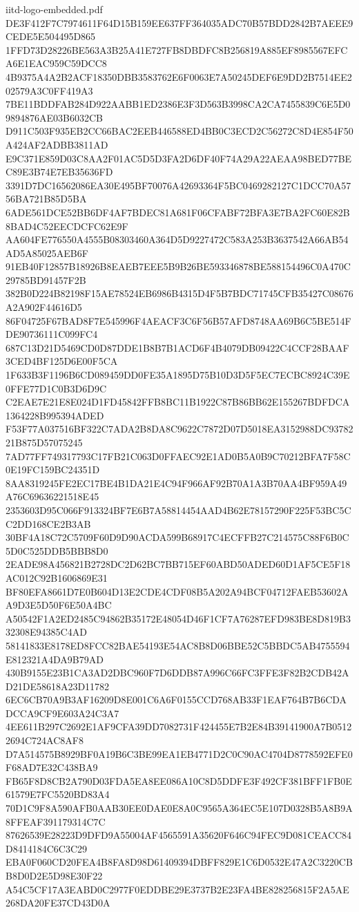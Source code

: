 \begin{filecontents*}[overwrite]{iitd-logo-embedded.pdf}
DE3F412F7C7974611F64D15B159EE637FF364035ADC70B57BDD2842B7AEEE9CEDE5E504495D865
1FFD73D28226BE563A3B25A41E727FB8DBDFC8B256819A885EF8985567EFCA6E1EAC959C59DCC8
4B9375A4A2B2ACF18350DBB3583762E6F0063E7A50245DEF6E9DD2B7514EE202579A3C0FF419A3
7BE11BDDFAB284D922AABB1ED2386E3F3D563B3998CA2CA7455839C6E5D09894876AE03B6032CB
D911C503F935EB2CC66BAC2EEB446588ED4BB0C3ECD2C56272C8D4E854F50A424AF2ADBB3811AD
E9C371E859D03C8AA2F01AC5D5D3FA2D6DF40F74A29A22AEAA98BED77BEC89E3B74E7EB35636FD
3391D7DC16562086EA30E495BF70076A42693364F5BC0469282127C1DCC70A5756BA721B85D5BA
6ADE561DCE52BB6DF4AF7BDEC81A681F06CFABF72BFA3E7BA2FC60E82B8BAD4C52EECDCFC62E9F
AA604FE776550A4555B08303460A364D5D9227472C583A253B3637542A66AB54AD5A85025AEB6F
91EB40F12857B18926B8EAEB7EEE5B9B26BE593346878BE588154496C0A470C29785BD91457F2B
382B0D224B82198F15AE78524EB6986B4315D4F5B7BDC71745CFB35427C08676A2A902F44616D5
86F04725F67BAD8F7E545996F4AEACF3C6F56B57AFD8748AA69B6C5BE514FDE90736111C099FC4
687C13D21D5469CD0D87DDE1B8B7B1ACD6F4B4079DB09422C4CCF28BAAF3CED4BF125D6E00F5CA
1F633B3F1196B6CD089459DD0FE35A1895D75B10D3D5F5EC7ECBC8924C39E0FFE77D1C0B3D6D9C
C2EAE7E21E8E024D1FD45842FFB8BC11B1922C87B86BB62E155267BDFDCA1364228B995394ADED
F53F77A037516BF322C7ADA2B8DA8C9622C7872D07D5018EA3152988DC9378221B875D57075245
7AD77FF749317793C17FB21C063D0FFAEC92E1AD0B5A0B9C70212BFA7F58C0E19FC159BC24351D
8AA8319245FE2EC17BE4B1DA21E4C94F966AF92B70A1A3B70AA4BF959A49A76C69636221518E45
2353603D95C066F913324BF7E6B7A58814454AAD4B62E78157290F225F53BC5CC2DD168CE2B3AB
30BF4A18C72C5709F60D9D90ACDA599B68917C4ECFFB27C214575C88F6B0C5D0C525DDB5BBB8D0
2EADE98A456821B2728DC2D62BC7BB715EF60ABD50ADED60D1AF5CE5F18AC012C92B1606869E31
BF80EFA8661D7E0B604D13E2CDE4CDF08B5A202A94BCF04712FAEB53602AA9D3E5D50F6E50A4BC
A50542F1A2ED2485C94862B35172E48054D46F1CF7A76287EFD983BE8D819B332308E94385C4AD
58141833E8178ED8FCC82BAE54193E54AC8B8D06BBE52C5BBDC5AB4755594E812321A4DA9B79AD
430B9155E23B1CA3AD2DBC960F7D6DDB87A996C66FC3FFE3F82B2CDB42AD21DE58618A23D11782
6EC6CB70A9B3AF16209D8E001C6A6F0155CCD768AB33F1EAF764B7B6CDADCCA9CF9E603A24C3A7
4EE611B297C2692E1AF9CFA39DD7082731F424455E7B2E84B39141900A7B05122694C724AC8AF8
D7A514575B8929BF0A19B6C3BE99EA1EB4771D2C0C90AC4704D8778592EFE0F68AD7E32C438BA9
FB65F8D8CB2A790D03FDA5EA8EE086A10C8D5DDFE3F492CF381BFF1FB0E61579E7FC5520BD83A4
70D1C9F8A590AFB0AAB30EE0DAE0E8A0C9565A364EC5E107D0328B5A8B9A8FFEAF391179314C7C
87626539E28223D9DFD9A55004AF4565591A35620F646C94FEC9D081CEACC84D8414184C6C3C29
EBA0F060CD20FEA4B8FA8D98D61409394DBFF829E1C6D0532E47A2C3220CBB8D0D2E5D98E30F22
A54C5CF17A3EABD0C2977F0EDDBE29E3737B2E23FA4BE828256815F2A5AE268DA20FE37CD43D0A

\end{filecontents*}
